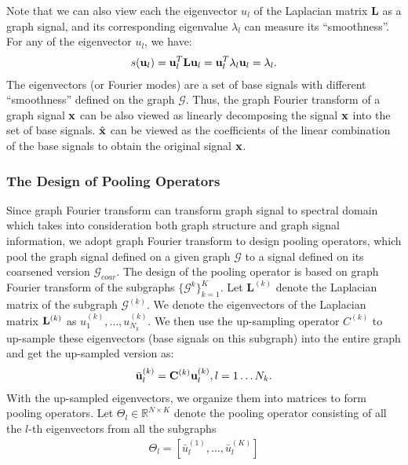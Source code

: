 \documentclass[sigconf]{acmart}
\begin{document}
Note that we can also view each the eigenvector $u_l$ of the Laplacian matrix $\mathbf{L}$ as a graph signal, and its corresponding eigenvalue $\lambda_l$ can measure its ``smoothness''. For any of the eigenvector $u_l$, we have: 
\begin{align}
    s({\bf u}_l) = {\bf u}_l ^T {\bf L} {\bf u}_l = {\bf u}_l^T \lambda_l {\bf u}_l = \lambda_l.
\end{align}
The eigenvectors (or Fourier modes) are a set of base signals with different ``smoothness'' defined on the graph $\mathcal{G}$. Thus, the graph Fourier transform of a graph signal $\bf{x}$ can be also viewed as linearly decomposing the signal $\bf x$ into the set of base signals. $\hat{\bf x}$ can be viewed as the coefficients of the linear combination of the base signals to obtain the original signal ${\bf x}$. 

\subsubsection{The Design of Pooling Operators}
Since graph Fourier transform can transform graph signal to spectral domain which takes into consideration both graph structure and graph signal information, we adopt graph Fourier transform to design pooling operators, which pool the graph signal defined on a given graph $\mathcal{G}$ to a signal defined on its coarsened version $\mathcal{G}_{coar}$. The design of the pooling operator is based on graph Fourier transform of the subgraphs $\{\mathcal{G}^{k}\}_{k=1}^K$. Let $\mathbf{L}^{(k)}$ denote the Laplacian matrix of the subgraph $\mathcal{G}^{(k)}$. We denote the eigenvectors of the Laplacian matrix ${\bf L}^{(k)}$ as $u^{(k)}_1,\dots, u^{(k)}_{N_k}$. We then use the up-sampling operator $C^{(k)}$ to up-sample these eigenvectors (base signals on this subgraph) into the entire graph and get the up-sampled version as:
\begin{align} \label{eq:bar_u_lk}
   \bar{\bf u}^{(k)}_l = {\bf C}^{(k)} {\bf u}^{(k)}_l, l=1\dots N_k.
\end{align}
With the up-sampled eigenvectors, we organize them into matrices to form pooling operators. Let $\Theta_l \in \mathbb{R}^{N\times K}$ denote the pooling operator consisting of all the $l$-th eigenvectors from all the subgraphs
\begin{align} \label{eq:Theta_l}
    \Theta_l = [\bar{u}^{(1)}_l,\dots,\bar{u}^{(K)}_l]
\end{align}
\end{document}
